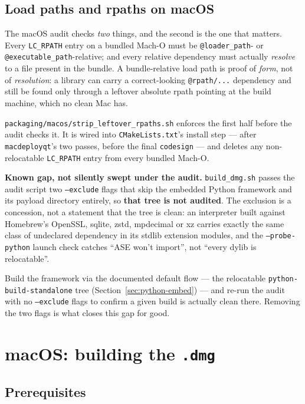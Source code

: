 \documentclass[11pt,a4paper]{article}
\newcommand{\file}[1]{\texttt{#1}}
\newcommand{\opt}[1]{\texttt{#1}}
\begin{document}
\subsection{Load paths and rpaths on macOS}
\label{sec:rpath-rule}

The macOS audit checks \emph{two} things, and the second is the one that
matters. Every \opt{LC\_RPATH} entry on a bundled Mach-O must be
\file{@loader\_path}- or \file{@executable\_path}-relative; and every
relative dependency must actually \emph{resolve} to a file present in the
bundle. A bundle-relative load path is proof of \emph{form}, not of
\emph{resolution}: a library can carry a correct-looking
\file{@rpath/...} dependency and still be found only through a leftover
absolute rpath pointing at the build machine, which no clean Mac has.

\file{packaging/macos/strip\_leftover\_rpaths.sh} enforces the first half
before the audit checks it. It is wired into \file{CMakeLists.txt}'s
install step --- after \opt{macdeployqt}'s two passes, before the final
\opt{codesign} --- and deletes any non-relocatable \opt{LC\_RPATH} entry
from every bundled Mach-O.

\medskip
\noindent\textbf{Known gap, not silently swept under the audit.}
\file{build\_dmg.sh} passes the audit script two \opt{--exclude} flags
that skip the embedded Python framework and its payload directory
entirely, so \textbf{that tree is not audited}. The exclusion is a
concession, not a statement that the tree is clean: an interpreter built
against Homebrew's OpenSSL, sqlite, zstd, mpdecimal or xz carries exactly
the same class of undeclared dependency in its stdlib extension modules,
and the \opt{--probe-python} launch check catches ``ASE won't import'',
not ``every dylib is relocatable''.

Build the framework via the documented default flow --- the relocatable
\opt{python-build-standalone} tree (Section~\ref{sec:python-embed}) ---
and re-run the audit with no \opt{--exclude} flags to confirm a given
build is actually clean there. Removing the two flags is what closes this
gap for good.

\section{macOS: building the \file{.dmg}}

\subsection{Prerequisites}
\end{document}
